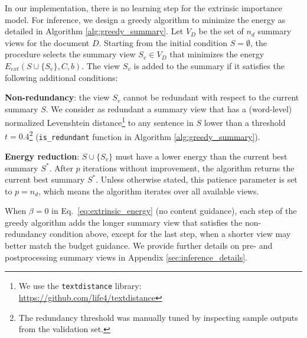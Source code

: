 \documentclass[11pt,table]{article}
\newenvironment{itemizesquish}[2]{\begin{list}{\labelitemi}{\setlength{\itemsep}{#1}\setlength{\labelwidth}{#2}\setlength{\leftmargin}{\labelwidth}\addtolength{\leftmargin}{\labelsep}}}{\end{list}}
\begin{document}
In our implementation, there is no learning step for the extrinsic importance model. For inference, we design a greedy algorithm to minimize the energy as detailed in Algorithm \ref{alg:greedy_summary}. Let $V_D$ be the set of $n_d$ summary views for the document $D$. Starting from the initial condition $S = \emptyset$, the procedure selects the summary view $S_v \in V_D$ that minimizes the energy $E_{ext}(S \cup \{S_v\},C,b)$. The view $S_v$ is added to the summary if it satisfies the following additional conditions:
\begin{itemizesquish}{-0.3em}{0.5em}
    \item \textbf{Non-redundancy}: the view $S_v$ cannot be redundant with respect to the current summary $S$. We consider as redundant a summary view that has a (word-level) normalized Levenshtein distance\footnote{We use the \texttt{textdistance} library:\\ \url{https://github.com/life4/textdistance}} \citep{levenshtein1966binary} to any sentence in $S$ lower than a threshold $t=0.4$\footnote{The redundancy threshold was manually tuned by inspecting sample outputs from the validation set.} (\texttt{is\_redundant} function in Algorithm \ref{alg:greedy_summary}).
    \item \textbf{Energy reduction}: $S \cup \{S_v\}$ must have a lower energy than the current best summary $S^*$. After $p$ iterations without improvement, the algorithm returns the current best summary $S^*$. Unless otherwise stated, this patience parameter is set to $p=n_d$, which means the algorithm iterates over all available views.
\end{itemizesquish}
When $\beta = 0$ in Eq.~\ref{eq:extrinsic_energy} (no content guidance), each step of the greedy algorithm adds the longer summary view that satisfies the non-redundancy condition above, except for the last step, when a shorter 
view may better match the budget guidance. We provide further details on pre- and postprocessing summary views in Appendix \ref{sec:inference_details}.
\DecMargin{2em}
\end{document}
